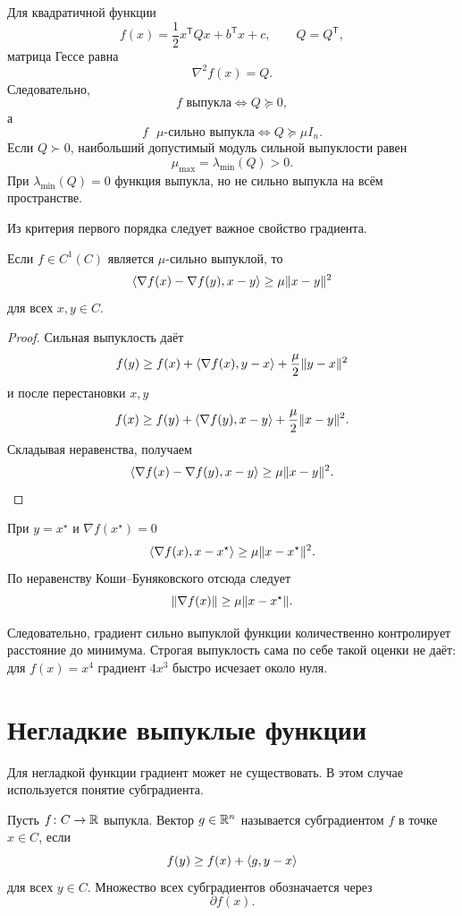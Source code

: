Для квадратичной функции
\[
    f(x)=\frac12x^{\mathsf T}Qx+b^{\mathsf T}x+c,
    \qquad Q=Q^{\mathsf T},
\]
матрица Гессе равна
\[
    \nabla^2f(x)=Q.
\]
Следовательно,
\[
    f\text{ выпукла}
    \Longleftrightarrow
    Q\succeq0,
\]
а
\[
    f\text{ \(\mu\)-сильно выпукла}
    \Longleftrightarrow
    Q\succeq\mu I_n.
\]
Если \(Q\succ0\), наибольший допустимый модуль сильной выпуклости
равен
\[
    \mu_{\max}=\lambda_{\min}(Q)>0.
\]
При \(\lambda_{\min}(Q)=0\) функция выпукла, но не сильно выпукла на
всём пространстве.



Из критерия первого порядка следует важное свойство градиента.

\begin{theorem}
Если \(f\in C^1(C)\) является \(\mu\)-сильно выпуклой, то
\[
    \left\langle \nabla f(x)-\nabla f(y),x-y \right\rangle
    \ge
    \mu\lVert x-y\rVert^2
\]
для всех \(x,y\in C\).
\end{theorem}

\begin{proof}
Сильная выпуклость даёт
\[
    f(y)
    \ge
    f(x)
    +
    \left\langle \nabla f(x),y-x \right\rangle
    +
    \frac{\mu}{2}\lVert y-x\rVert^2
\]
и после перестановки \(x,y\)
\[
    f(x)
    \ge
    f(y)
    +
    \left\langle \nabla f(y),x-y \right\rangle
    +
    \frac{\mu}{2}\lVert x-y\rVert^2.
\]
Складывая неравенства, получаем
\[
    \left\langle \nabla f(x)-\nabla f(y),x-y \right\rangle
    \ge
    \mu\lVert x-y\rVert^2.
\]
\end{proof}

При \(y=x^\star\) и \(\nabla f(x^\star)=0\)
\[
    \left\langle \nabla f(x),x-x^\star \right\rangle
    \ge
    \mu\lVert x-x^\star\rVert^2.
\]
По неравенству Коши--Буняковского отсюда следует
\[
    \lVert\nabla f(x)\rVert
    \ge
    \mu\lVert x-x^\star\rVert.
\]

Следовательно, градиент сильно выпуклой функции количественно
контролирует расстояние до минимума. Строгая выпуклость сама по себе
такой оценки не даёт: для \(f(x)=x^4\) градиент \(4x^3\) быстро
исчезает около нуля.

\section{Негладкие выпуклые функции}

Для негладкой функции градиент может не существовать. В этом случае
используется понятие субградиента.

\begin{definition}[Субградиент]
Пусть \(f\colon C\to\mathbb{R}\) выпукла. Вектор \(g\in\mathbb{R}^n\) называется
субградиентом \(f\) в точке \(x\in C\), если
\[
    f(y)
    \ge
    f(x)+\left\langle g,y-x \right\rangle
\]
для всех \(y\in C\).
Множество всех субградиентов обозначается через
\[
    \partial f(x).
\]
\end{definition}

